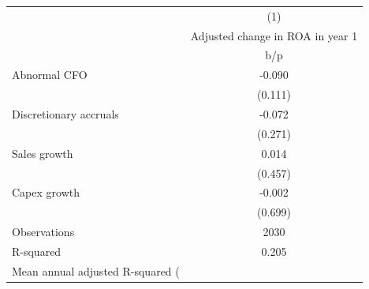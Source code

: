 {
\def\sym#1{\ifmmode^{#1}\else\(^{#1}\)\fi}
\begin{tabular}{l*{1}{c}}
\hline\hline
                    &\multicolumn{1}{c}{(1)}\\
                    &\multicolumn{1}{c}{Adjusted change in ROA in year 1}\\
                    &         b/p   \\
\hline
Abnormal CFO        &      -0.090   \\
                    &     (0.111)   \\
Discretionary accruals&      -0.072   \\
                    &     (0.271)   \\
Sales growth        &       0.014   \\
                    &     (0.457)   \\
Capex growth        &      -0.002   \\
                    &     (0.699)   \\
\hline
Observations        &        2030   \\
R-squared           &       0.205   \\
Mean annual adjusted R-squared (%
\hline\hline
\end{tabular}
}
